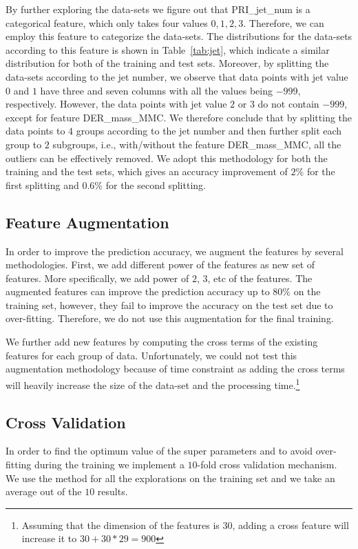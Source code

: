\documentclass[10pt,conference,compsocconf]{IEEEtran}
\begin{document}
By further exploring the data-sets we figure out that PRI\_jet\_num is a categorical feature, which only takes four values $0,1,2,3$. Therefore, we can employ this feature to categorize the data-sets. The distributions for the data-sets according to this feature is shown in Table~\ref{tab:jet}, which indicate a similar distribution for both of the training and test sets.
Moreover, by splitting the data-sets according to the jet number, we observe that data points with jet value $0$ and $1$ have three and seven columns with all the values being $-999$, respectively. However, the data points with jet value $2$ or $3$ do not contain $-999$, except for feature DER\_mass\_MMC.
We therefore conclude that by splitting the data points to $4$ groups according to the jet number and then further split each group to $2$ subgroups, i.e., with/without the feature DER\_mass\_MMC, all the outliers can be effectively removed. We adopt this methodology for both the training and the test sets, which gives an accuracy improvement of $2\%$ for the first splitting and $0.6\%$ for the second splitting.
 

\subsection{Feature Augmentation}
In order to improve the prediction accuracy, we augment the features by several methodologies.
First, we add different power of the features as new set of features. More specifically, we add power of $2$, $3$, etc of the features. The augmented features can improve the prediction accuracy up to $80\%$ on the training set, however, they fail to improve the accuracy on the test set due to over-fitting. Therefore, we do not use this augmentation for the final training.

We further add new features by computing the cross terms of the existing features for each group of data. Unfortunately, we could not test this augmentation methodology because of time constraint as adding the cross terms will heavily increase the size of the data-set and the processing time.\footnote{Assuming that the dimension of the features is $30$, adding a cross feature will increase it to $30+30*29=900$}

\subsection{Cross Validation}
In order to find the optimum value of the super parameters and to avoid over-fitting during the training we implement a $10$-fold cross validation mechanism.
We use the method for all the explorations on the training set and we take an average out of the $10$ results.
\end{document}
